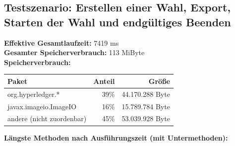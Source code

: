 \documentclass[parskip=full]{scrartcl}
\begin{document}
\subsection{Testszenario: Erstellen einer Wahl, Export, Starten der Wahl und endgültiges Beenden}
\textbf{Effektive Gesamtlaufzeit:} 7419 ms\\
\textbf{Gesamter Speicherverbrauch:} 113 MiByte \\
\textbf{Speicherverbrauch:}

\begin{table}[h!]
	\begin{tabular}[t]{l r r}
		Paket & Anteil & Größe \\ \hline
		org.hyperledger.* & 39\% & 44.170.288 Byte \\
		javax.imageio.ImageIO & 16\% & 15.789.784 Byte \\
		andere (nicht zuordenbar) & 45\% & 53.039.928 Byte \\
	\end{tabular}
\end{table}
\textbf{Längste Methoden nach Ausführungszeit (mit Untermethoden):}
\end{document}
